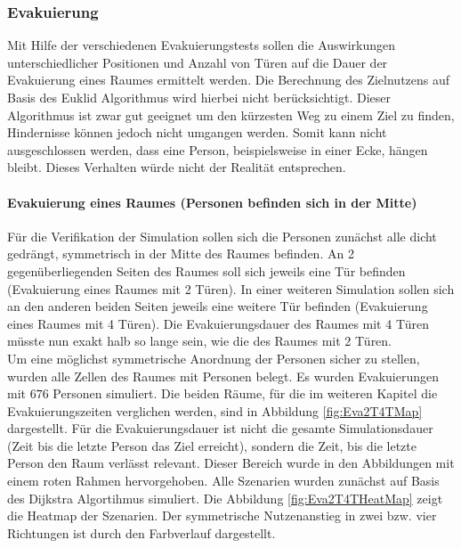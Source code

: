 \subsubsection{Evakuierung}
Mit Hilfe der verschiedenen Evakuierungstests sollen die Auswirkungen unterschiedlicher Positionen und Anzahl von Türen auf die Dauer der Evakuierung eines Raumes ermittelt werden. Die Berechnung des Zielnutzens auf Basis des Euklid Algorithmus wird hierbei nicht berücksichtigt. Dieser Algorithmus ist zwar gut geeignet um den kürzesten Weg zu einem Ziel zu finden, Hindernisse können jedoch nicht umgangen werden. Somit kann nicht ausgeschlossen werden, dass eine Person, beispielsweise in einer Ecke, \glqq hängen bleibt\grqq. Dieses Verhalten würde nicht der Realität entsprechen.

\paragraph{Evakuierung eines Raumes (Personen befinden sich in der Mitte)}
\label{EvaVerifikation}
Für die Verifikation der Simulation sollen sich die Personen zunächst alle dicht gedrängt, symmetrisch in der Mitte des Raumes befinden. An 2 gegenüberliegenden Seiten des Raumes soll sich jeweils eine Tür befinden (Evakuierung eines Raumes mit 2 Türen). In einer weiteren Simulation sollen sich an den anderen beiden Seiten jeweils eine weitere Tür befinden (Evakuierung eines Raumes mit 4 Türen). Die Evakuierungsdauer des Raumes mit 4 Türen müsste nun exakt halb so lange sein, wie die des Raumes mit 2 Türen. \\ 

Um eine möglichst symmetrische Anordnung der Personen sicher zu stellen, wurden alle Zellen des Raumes mit Personen belegt. Es wurden Evakuierungen mit $676$ Personen simuliert. Die beiden Räume, für die im weiteren Kapitel die Evakuierungszeiten verglichen werden, sind in Abbildung \ref{fig:Eva2T4TMap} dargestellt. Für die Evakuierungsdauer ist nicht die gesamte Simulationsdauer (Zeit bis die letzte Person das Ziel erreicht), sondern die Zeit, bis die letzte Person den Raum verlässt relevant. Dieser Bereich wurde in den Abbildungen mit einem roten Rahmen hervorgehoben. Alle Szenarien wurden zunächst auf Basis des Dijkstra Algortihmus simuliert. Die Abbildung \ref{fig:Eva2T4THeatMap} zeigt die Heatmap der Szenarien. Der symmetrische Nutzenanstieg in zwei bzw. vier Richtungen ist durch den Farbverlauf dargestellt. 


